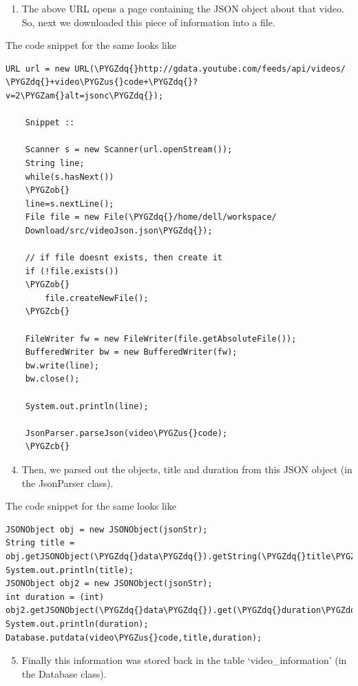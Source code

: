 \documentclass[a4paper,12pt,oneside]{sphinxmanual}
\def\PYGZus{\char`\_}
\def\PYGZob{\char`\{}
\def\PYGZcb{\char`\}}
\def\PYGZam{\char`\&}
\def\PYGZdq{\char`\"}
\begin{document}
\begin{enumerate}
\item {} 
The above URL opens a page containing the JSON object about that video. So, next we downloaded this piece of information into a file.

\end{enumerate}

The code snippet for the same looks like

\begin{Verbatim}[commandchars=\\\{\}]
URL url = new URL(\PYGZdq{}http://gdata.youtube.com/feeds/api/videos/
\PYGZdq{}+video\PYGZus{}code+\PYGZdq{}?v=2\PYGZam{}alt=jsonc\PYGZdq{});

    Snippet ::

    Scanner s = new Scanner(url.openStream());
    String line;
    while(s.hasNext())
    \PYGZob{}
    line=s.nextLine();
    File file = new File(\PYGZdq{}/home/dell/workspace/
    Download/src/videoJson.json\PYGZdq{});

    // if file doesnt exists, then create it
    if (!file.exists())
    \PYGZob{}
        file.createNewFile();
    \PYGZcb{}

    FileWriter fw = new FileWriter(file.getAbsoluteFile());
    BufferedWriter bw = new BufferedWriter(fw);
    bw.write(line);
    bw.close();

    System.out.println(line);

    JsonParser.parseJson(video\PYGZus{}code);
    \PYGZcb{}
\end{Verbatim}
\begin{enumerate}
\setcounter{enumi}{3}
\item {} 
Then, we parsed out the objects, title and duration from this JSON object (in the JsonParser class).

\end{enumerate}

The code snippet for the same looks like

\begin{Verbatim}[commandchars=\\\{\}]
JSONObject obj = new JSONObject(jsonStr);
String title = obj.getJSONObject(\PYGZdq{}data\PYGZdq{}).getString(\PYGZdq{}title\PYGZdq{});
System.out.println(title);
JSONObject obj2 = new JSONObject(jsonStr);
int duration = (int) obj2.getJSONObject(\PYGZdq{}data\PYGZdq{}).get(\PYGZdq{}duration\PYGZdq{});
System.out.println(duration);
Database.putdata(video\PYGZus{}code,title,duration);
\end{Verbatim}
\begin{enumerate}
\setcounter{enumi}{4}
\item {} 
Finally this information was stored back in the table `video\_information' (in the Database class).

\end{enumerate}
\end{document}
